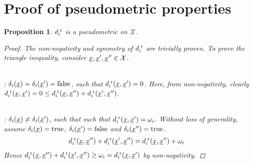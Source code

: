 \documentclass[letterpaper]{article}
\newcommand{\vect}[1]{\underline{\smash{#1}}}
\renewcommand{\v}[1]{\vect{#1}}
\newcommand{\sX}{\mathcal{X}}
\newcommand{\br}{^{\text{\textnormal{ r}}}}
\newtheorem{prop}[thm]{Proposition}
\begin{document}
\appendix

\section{Proof of pseudometric properties}

\begin{prop}
  $d\br_i$ is a pseudometric on $\sX$. \label{prop:dbr_pseudometric}
\begin{proof}
The non-negativity and symmetry of $d\br_i$ are trivially proven. To prove the triangle inequality, consider $\v{x}, \v{x}', \v{x}'' \in \sX$. 

~\\: $\delta_i(\v{x}) = \delta_i(\v{x}') = \textrm{false}$, such that $d\br_i(\v{x},\v{x}') = 0$. Here, from non-negativity, clearly $d\br_i(\v{x},\v{x}') = 0 \leq d\br_i(\v{x},\v{x}'') + d\br_i(\v{x}',\v{x}'')$.

~\\: $\delta_i(\v{x}) \neq \delta_i(\v{x}')$, such that such that  $d\br_i(\v{x},\v{x}') = \omega_i$.  Without loss of generality, assume $\delta_i(\v{x}) = \text{true}$, $\delta_i(\v{x}') = \text{false}$ and $\delta_i(\v{x}'') = \text{true}$. 
\begin{align}
d\br_i(\v{x},\v{x}'') + d\br_i(\v{x}',\v{x}'') = d\br_i(\v{x},\v{x}'')  + \omega_i
\end{align}
Hence $d\br_i(\v{x},\v{x}'') + d\br_i(\v{x}',\v{x}'') \geq \omega_i = d\br_i(\v{x},\v{x}')$ by non-negativity.


\end{proof}
\end{prop}
\end{document}
